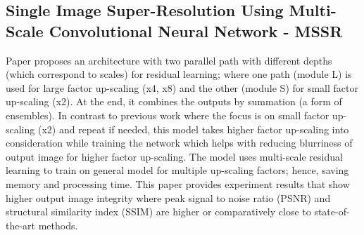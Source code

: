 \documentclass[11pt]{article}
\begin{document}
\subsection{Single Image Super-Resolution Using Multi-Scale Convolutional Neural Network - MSSR \cite{MSSRwCNN}}

  Paper proposes an architecture with two parallel path with different depths (which correspond to scales) for residual learning; where one path (module L) is used for large factor up-scaling (x4, x8) and the other (module S) for small factor up-scaling (x2). At the end, it combines the outputs by summation (a form of ensembles). In contrast to previous work where the focus is on small factor up-scaling (x2) and repeat if needed, this model takes higher factor up-scaling into consideration while training the network which helps with reducing blurriness of output image for higher factor up-scaling. The model uses multi-scale residual learning to train on general model for multiple up-scaling factors; hence, saving memory and processing time. This paper provides experiment results that show higher output image integrity where peak signal to noise ratio (PSNR) and structural similarity index (SSIM) are higher or comparatively close to state-of-the-art methods.  
\end{document}
